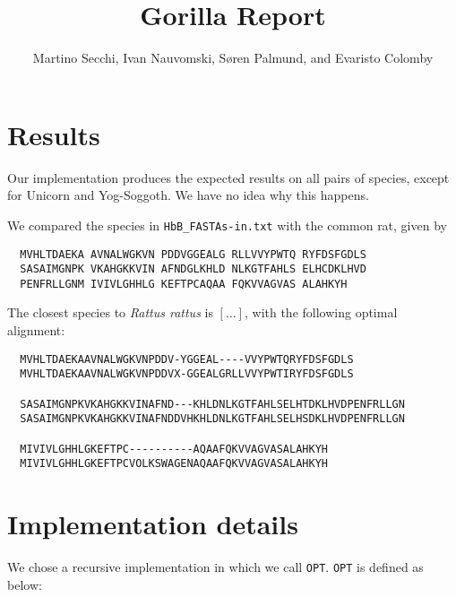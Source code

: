\documentclass{tufte-handout}
\title{Gorilla Report}
\author{Martino Secchi, Ivan Nauvomski, Søren Palmund, and Evaristo Colomby}
\begin{document}
  \maketitle

  \section{Results}

  Our implementation produces the expected results on all pairs of species, except for Unicorn and Yog-Soggoth.
  We have no idea why this happens.%

  We compared the species in \verb!HbB_FASTAs-in.txt!
  with the common rat, given by

  \begin{verbatim}
  MVHLTDAEKA AVNALWGKVN PDDVGGEALG RLLVVYPWTQ RYFDSFGDLS
  SASAIMGNPK VKAHGKKVIN AFNDGLKHLD NLKGTFAHLS ELHCDKLHVD
  PENFRLLGNM IVIVLGHHLG KEFTPCAQAA FQKVVAGVAS ALAHKYH
  \end{verbatim}

  The closest species to \emph{Rattus rattus} is $[\ldots]$, with the following optimal alignment:

\medskip
  \begin{fullwidth}\small
  \begin{verbatim}
  MVHLTDAEKAAVNALWGKVNPDDV-YGGEAL----VVYPWTQRYFDSFGDLS
  MVHLTDAEKAAVNALWGKVNPDDVX-GGEALGRLLVVYPWTIRYFDSFGDLS

  SASAIMGNPKVKAHGKKVINAFND---KHLDNLKGTFAHLSELHTDKLHVDPENFRLLGN
  SASAIMGNPKVKAHGKKVINAFNDDVHKHLDNLKGTFAHLSELHSDKLHVDPENFRLLGN

  MIVIVLGHHLGKEFTPC----------AQAAFQKVVAGVASALAHKYH
  MIVIVLGHHLGKEFTPCVOLKSWAGENAQAAFQKVVAGVASALAHKYH
  \end{verbatim}
\end{fullwidth}



  \section{Implementation details}

  We chose a recursive implementation in which we call \verb+OPT+. \verb+OPT+ is defined as below:
  
\end{document}
